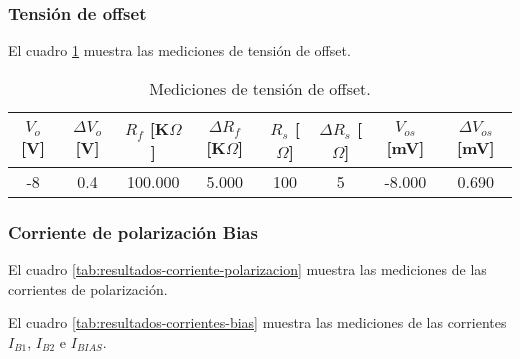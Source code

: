 \subsubsection{Tensión de offset}

El cuadro \ref{tab:resultados-tension-offset} muestra las mediciones de tensión de offset.

\begin{table}[h!]
\centering
\begin{tabular}{|c|c|c|c|c|c|c|c|}
\hline
$V_o$ [V] & $\Delta V_o$ [V] & $R_f$ [K$\Omega$] & $\Delta R_f$ [K$\Omega$] & $R_s$ [$\Omega$] & $\Delta R_s$ [$\Omega$] & $V_{os}$ [mV] & $\Delta V_{os}$ [mV] \\ \hline
-8 & 0.4 & 100.000 & 5.000 & 100 & 5 & -8.000 & 0.690 \\ \hline
\end{tabular}
\caption{Mediciones de tensión de offset.}
\label{tab:resultados-tension-offset}
\end{table}

\subsubsection{Corriente de polarización Bias}

El cuadro \ref{tab:resultados-corriente-polarizacion} muestra las mediciones de las corrientes de polarización.

\begin{table}[h!]
\centering
{}
\caption{Mediciones de corriente de polarización.}
\label{tab:resultados-corriente-polarizacion}
\end{table}

El cuadro \ref{tab:resultados-corrientes-bias} muestra las mediciones de las corrientes $I_{B1}$, $I_{B2}$ e $I_{BIAS}$.

